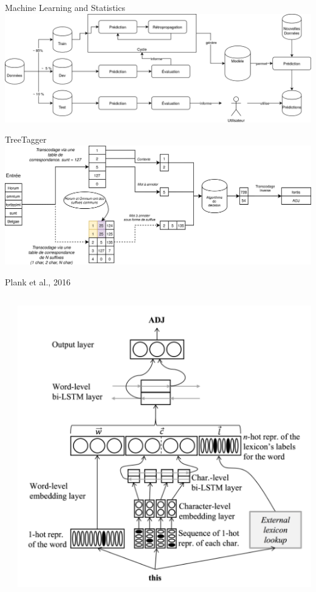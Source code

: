 \documentclass[aspectratio=169]{beamer}
\begin{document}
\begin{frame}{Machine Learning and Statistics}
    \includegraphics[width=\textwidth]{nlp-for-ch/images/MachineLearning.png}
\end{frame}

\begin{frame}{TreeTagger}
    \centering
    \includegraphics[width=\textwidth]{nlp-for-ch/images/treetagger_type.png}
\end{frame}

\begin{frame}{Plank et al., 2016}
    \begin{columns}
        \begin{column}{.5\textwidth}
        \end{column}
        \begin{column}{.5\textwidth}
            \centering
            \includegraphics[height=.8\textheight]{nlp-for-ch/images/planketal.png}
        \end{column}
    \end{columns}
\end{frame}
\end{document}
